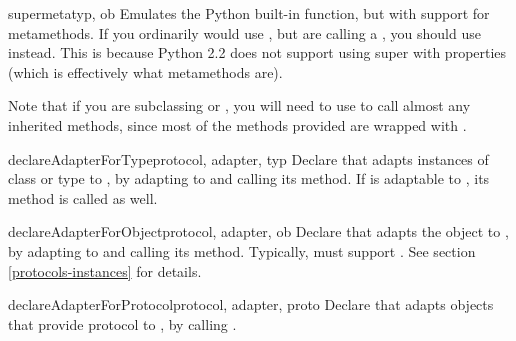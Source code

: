 \begin{verbatim%
}
\begin{verbatim%
}
\begin{verbatim%
}
\begin{verbatim%
}
\begin{verbatim%
}
\begin{verbatim%
}
\begin{funcdesc}{supermeta}{typ, ob}
Emulates the Python built-in  function, but with support for
metamethods.  If you ordinarily would use , but are calling a
, you should use  instead.  This is
because Python 2.2 does not support using super with properties (which is
effectively what metamethods are).

Note that if you are subclassing  or , you
will need to use  to call almost any inherited methods,
since most of the methods provided are wrapped with .
\end{funcdesc}

\begin{funcdesc}{declareAdapterForType}{protocol, adapter, typ }
Declare that  adapts instances of class or type 
to , by adapting  to  and
calling its  method.  If  is adaptable
to , its  method is
called as well.
\end{funcdesc}

\begin{funcdesc}{declareAdapterForObject}{protocol, adapter, ob }
Declare that  adapts the object  to , by
adapting  to  and calling its
 method.  Typically,  must support
.  See section \ref{protocols-instances} for details.
\end{funcdesc}

\begin{funcdesc}{declareAdapterForProtocol}{protocol, adapter, proto }
Declare that  adapts objects that provide protocol 
to , by calling
.

\end{funcdesc}


































\end{verbatim%
}
\end{verbatim%
}
\end{verbatim%
}
\end{verbatim%
}
\end{verbatim%
}
\end{verbatim%
}
